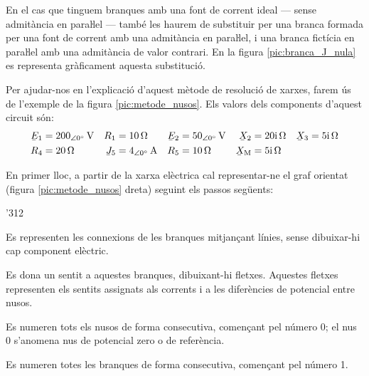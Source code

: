 En el cas que tinguem branques amb una font de corrent ideal --- sense admitància en paraŀlel ---  també les haurem de substituir per una branca  formada per una font de corrent amb una admitància en paraŀlel, i una branca fictícia en paraŀlel amb una admitància de valor contrari. En la figura \vref{pic:branca_J_nula} es representa gràficament aquesta substitució.
\begin{center}
	
	\label{pic:branca_J_nula}
\end{center}

Per ajudar-nos en l'explicació d'aquest mètode de resolució de xarxes, farem
ús de l'exemple de la figura \vref{pic:metode_nusos}. Els valors dels components d'aquest
circuit són:
\begin{align*}
   \cmplx{E}_1 &= \qtypd{200}{0}{V} & R_1 &= \qty{10}{\ohm} &
   \cmplx{E}_2 &= \qtypd{50}{0}{V}  & \cmplx{X}_2 &= \complexqty{j20}{\ohm} &
   \cmplx{X}_3 &= \complexqty{j5}{\ohm} \\
   R_4 &= \qty{20}{\ohm} & \cmplx{J}_5 &= \qtypd{4}{0}{A} &
   R_5 &= \qty{10}{\ohm} & \cmplx{X}\ped{M} &= \complexqty{j5}{\ohm}
\end{align*}

\begin{center}
\vspace{-4mm}
    
    \label{pic:metode_nusos}
\end{center}

En primer lloc, a partir de la xarxa elèctrica
cal representar-ne el graf orientat (figura \vref{pic:metode_nusos} dreta) seguint els passos següents:
\begin{dingautolist}{'312}
   \item Es representen les connexions de les branques mitjançant línies, sense dibuixar-hi cap component elèctric.
   \item Es dona un sentit a aquestes branques, dibuixant-hi fletxes. Aquestes fletxes representen els sentits assignats als corrents i a les diferències de potencial entre nusos.
   \item Es numeren tots els nusos de forma consecutiva, començant pel número 0; el nus 0 s'anomena nus de potencial zero o de referència.
   \item Es numeren totes les branques de forma consecutiva, començant pel número 1.
\end{dingautolist}

